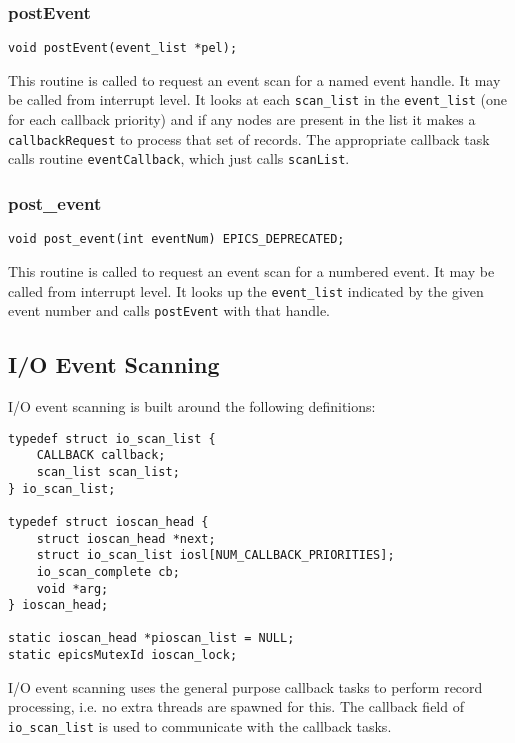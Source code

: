 \subsubsection{postEvent}

\begin{verbatim}
void postEvent(event_list *pel);
\end{verbatim}

This routine is called to request an event scan for a named event handle.
It may be called from interrupt level.
It looks at each \verb|scan_list| in the \verb|event_list| (one for each callback priority) and if any nodes are present in the list it makes a \verb|callbackRequest| to process that set of records.
The appropriate callback task calls routine \verb|eventCallback|, which just calls \verb|scanList|.

\subsubsection{post\_event}

\begin{verbatim}
void post_event(int eventNum) EPICS_DEPRECATED;
\end{verbatim}

This routine is called to request an event scan for a numbered event.
It may be called from interrupt level.
It looks up the \verb|event_list| indicated by the given event number and calls \verb|postEvent| with that handle.

\subsection{I/O Event Scanning}

I/O event scanning is built around the following definitions:

\begin{verbatim}
typedef struct io_scan_list {
    CALLBACK callback;
    scan_list scan_list;
} io_scan_list;

typedef struct ioscan_head {
    struct ioscan_head *next;
    struct io_scan_list iosl[NUM_CALLBACK_PRIORITIES];
    io_scan_complete cb;
    void *arg;
} ioscan_head;

static ioscan_head *pioscan_list = NULL;
static epicsMutexId ioscan_lock;
\end{verbatim}

I/O event scanning uses the general purpose callback tasks to perform record processing, i.e. no extra threads are spawned for this.
The callback field of \verb|io_scan_list| is used to communicate with the callback tasks.

